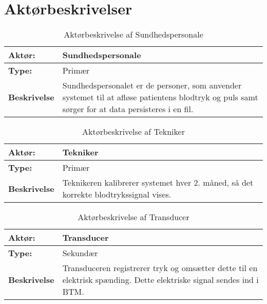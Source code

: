 \chapter{Aktørbeskrivelser}
\begin{table}[H]
\begin{center}
\begin{tabular} {| p{6cm} | p{9cm} |}
\hline
\textbf{Aktør:} & Sundhedspersonale \\ \hline
\textbf{Type:} & Primær \\ \hline
\textbf{Beskrivelse} & 
Sundhedspersonalet er de personer, som anvender systemet til at afløse patientens blodtryk og puls samt sørger for at data persisteres i en fil.
 \\ \hline
\end{tabular}
\end{center}
\caption{Aktørbeskrivelse af Sundhedspersonale}
\label{tb:AktorbeskrivelseSP}
\end{table}

\begin{table}[H]
\begin{center}
\begin{tabular} {| p{6cm} | p{9cm} |}
\hline
\textbf{Aktør:} & Tekniker \\ \hline
\textbf{Type:} & Primær \\ \hline
\textbf{Beskrivelse} & 
Teknikeren kalibrerer systemet hver 2. måned, så det korrekte blodtrykssignal vises.
 \\ \hline
\end{tabular}
\end{center}
\caption{Aktørbeskrivelse af Tekniker}
\label{tb:AktorbeskrivelseTK}
\end{table}

\begin{table}[H]
\begin{center}
\begin{tabular} {| p{6cm} | p{9cm} |}
\hline
\textbf{Aktør:} & Transducer \\ \hline
\textbf{Type:} & Sekundær \\ \hline
\textbf{Beskrivelse} & 
Transduceren registrerer tryk og omsætter dette til en elektrisk spænding. Dette elektriske signal sendes ind i BTM.
 \\ \hline
\end{tabular}
\end{center}
\caption{Aktørbeskrivelse af Transducer}
\label{tb:AktorbeskrivelseTD}
\end{table}


